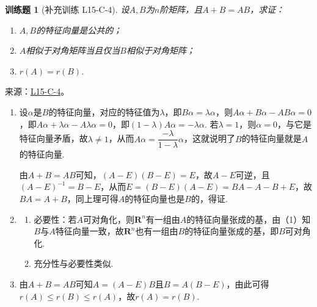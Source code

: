 \documentclass[12pt,fontset=fandol]{ctexart}
\newtheorem{exercise}{训练题}[section]
\begin{document}
\begin{exercise}[补充训练 L15-C-4]\label{prob:L15-C-4}
设$A,B$为$n$阶矩阵，且$A+B=AB$，求证：
        \begin{enumerate}
            \item $A,B$的特征向量是公共的；

            \item $A$相似于对角矩阵当且仅当$B$相似于对角矩阵；

            \item $r(A)=r(B)$.
        \end{enumerate}
\end{exercise}
\noindent 来源：\href{https://github.com/yhwu-is/Linear-Algebra-Left-Undone/blob/new/%E8%AE%B2%E4%B9%89/%E4%B8%93%E9%A2%98/15%20%E7%9B%B8%E4%BC%BC%E6%A0%87%E5%87%86%E5%BD%A2%EF%BC%9A%E5%A4%8D%E6%95%B0%E5%9F%9F%E4%B8%8A%E7%9A%84%E5%B0%9D%E8%AF%95%E4%B8%8E%E7%90%86%E8%AE%BA.tex}{L15-C-4}。
\begin{solve}
\begin{enumerate}
                \item 设$\alpha$是$B$的特征向量，对应的特征值为$\lambda$，即$B\alpha=\lambda\alpha$，则$A\alpha+B\alpha-AB\alpha=0$，即$A\alpha+\lambda\alpha-A\lambda\alpha=0$，即$(1-\lambda)A\alpha=-\lambda\alpha$. 若$\lambda=1$，则$\alpha=0$，与它是特征向量矛盾，故$\lambda\neq 1$，从而$A\alpha=\dfrac{-\lambda}{1-\lambda}\alpha$，这就说明了$B$的特征向量就是$A$的特征向量.

                      由$A+B=AB$可知，$(A-E)(B-E)=E$，故$A-E$可逆，且$(A-E)^{-1}=B-E$，从而$E=(B-E)(A-E)=BA-A-B+E$，故$BA=A+B$，同上理可得$A$的特征向量也是$B$的，得证.

                \item \begin{enumerate}
                          \item 必要性：若$A$可对角化，则$\mathbf{R}^n$有一组由$A$的特征向量张成的基，由（1）知$B$与$A$特征向量一致，故$\mathbf{R}^n$也有一组由$B$的特征向量张成的基，即$B$可对角化.

                          \item 充分性与必要性类似.
                      \end{enumerate}

                \item 由$A+B=AB$可知$A=(A-E)B$且$B=A(B-E)$，由此可得$r(A)\leqslant r(B)\leqslant r(A)$，故$r(A)=r(B)$.
            \end{enumerate}
\end{solve}
\end{document}
